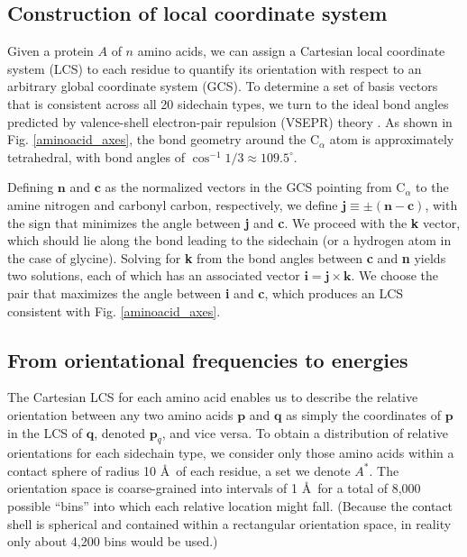 \documentclass[11pt,titlepage]{article}
\begin{document}
\subsection{Construction of local coordinate system}
Given a protein $A$ of $n$ amino acids, we can assign a Cartesian local coordinate system (LCS) to each residue to quantify its orientation with respect to an arbitrary global coordinate system (GCS).
To determine a set of basis vectors that is consistent across all 20 sidechain types, we turn to the ideal bond angles predicted by valence-shell electron-pair repulsion (VSEPR) theory \cite{gillespie}.
As shown in Fig. \ref{aminoacid_axes}, the bond geometry around the C$_\alpha$ atom is approximately tetrahedral, with bond angles of $\cos^{-1}{1/3}\approx 109.5^\circ$.

Defining $\textbf{n}$ and $\textbf{c}$ as the normalized vectors in the GCS pointing from C$_\alpha$ to the amine nitrogen and carbonyl carbon, respectively, we define $\textbf{j} \equiv \pm(\textbf{n} - \textbf{c})$, with the sign that minimizes the angle between \textbf{j} and \textbf{c}.
We proceed with the \textbf{k} vector, which should lie along the bond leading to the sidechain (or a hydrogen atom in the case of glycine).
Solving for \textbf{k} from the bond angles between \textbf{c} and \textbf{n} yields two solutions, each of which has an associated vector $\textbf{i}=\textbf{j}\times\textbf{k}$.
We choose the pair that maximizes the angle between \textbf{i} and \textbf{c}, which produces an LCS consistent with Fig. \ref{aminoacid_axes}.

\subsection{From orientational frequencies to energies}
The Cartesian LCS for each amino acid enables us to describe the relative orientation between any two amino acids $\textbf{p}$ and $\textbf{q}$ as simply the coordinates of $\textbf{p}$ in the LCS of $\textbf{q}$, denoted $\textbf{p}_q$, and vice versa.
To obtain a distribution of relative orientations for each sidechain type, we consider only those amino acids within a contact sphere of radius 10 \AA\, of each residue, a set we denote $A^*$.
The orientation space is coarse-grained into intervals of 1 \AA\, for a total of 8,000 possible ``bins'' into which each relative location might fall. (Because the contact shell is spherical and contained within a rectangular orientation space, in reality only about 4,200 bins would be used.)
\end{document}
